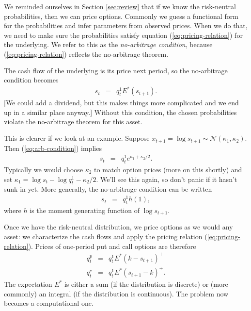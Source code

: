\documentclass[11pt]{article}
\begin{document}
We reminded ourselves in Section \ref{sec:review} that  
if we know the risk-neutral probabilities, then we can price options.
Commonly we guess a functional form for the probabilities 
and infer parameters from observed prices.
When we do that, we need to make sure the probabilities satisfy
equation (\ref{eq:pricing-relation}) for the underlying.
We refer to this as the {\it no-arbitrage condition\/},
because (\ref{eq:pricing-relation}) reflects the no-arbitrage theorem.


The cash flow of the underlying is its price next period,
so the no-arbitrage condition becomes
\begin{eqnarray}
    s_t  &=&  q^1_t  E^* (s_{t+1}) .
    \label{eq:arb-condition}
\end{eqnarray}
[We could add a dividend, but this makes things more complicated 
and we end up in a similar place anyway.]
Without this condition,
the chosen probabilities violate the no-arbitrage theorem for this asset.

This is clearer if we look at an example.
Suppose $x_{t+1} = \log s_{t+1} \sim \mathcal{N} (\kappa_1,\kappa_2)$.
Then (\ref{eq:arb-condition}) implies
\begin{eqnarray}
    s_t &=& q^1_t e^{\kappa_1 + \kappa_2/2}.
    \label{eq:bsm-no-arb}
\end{eqnarray}
Typically we would choose $\kappa_2$ to match option prices
(more on this shortly) 
and set $\kappa_1 = \log s_t -\log q_t^1 - \kappa_2/2$.
We'll see this again, so don't panic if it hasn't sunk in yet.
More generally, the no-arbitrage condition can be written
\begin{eqnarray*}
    s_t &=& q^1_t h(1) , %
\end{eqnarray*}
where $h$ is the moment generating function of $\log s_{t+1}$.

Once we have the risk-neutral distribution,
we price options as we would any asset:
we characterize the cash flows and apply the pricing relation
(\ref{eq:pricing-relation}).
Prices of one-period put and call options are therefore
\begin{eqnarray*}
        q^p_t &=&  q_t^1 E^* (k-s_{t+1})^+  \\
        q^c_t &=&  q_t^1 E^* (s_{t+1}-k)^+ .
\end{eqnarray*}
The expectation $E^*$ is either a sum (if the distribution is discrete)
or (more commonly) an integral (if the distribution is continuous).
The problem now becomes a computational one.  
\end{document}
